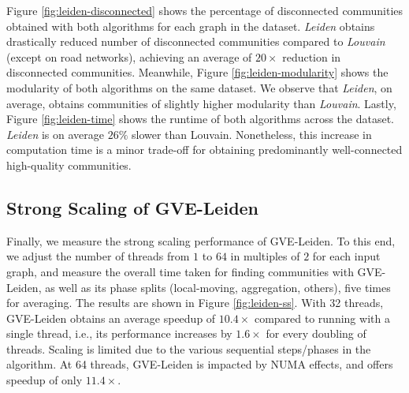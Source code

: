 Figure \ref{fig:leiden-disconnected} shows the percentage of disconnected communities obtained with both algorithms for each graph in the dataset. \textit{Leiden} obtains drastically reduced number of disconnected communities compared to \textit{Louvain} (except on road networks), achieving an average of $20\times$ reduction in disconnected communities. Meanwhile, Figure \ref{fig:leiden-modularity} shows the modularity of both algorithms on the same dataset. We observe that \textit{Leiden}, on average, obtains communities of slightly higher modularity than \textit{Louvain}. Lastly, Figure \ref{fig:leiden-time} shows the runtime of both algorithms across the dataset. \textit{Leiden} is on average $26\%$ slower than Louvain. Nonetheless, this increase in computation time is a minor trade-off for obtaining predominantly well-connected high-quality communities.




\subsection{Strong Scaling of GVE-Leiden}

Finally, we measure the strong scaling performance of GVE-Leiden. To this end, we adjust the number of threads from $1$ to $64$ in multiples of $2$ for each input graph, and measure the overall time taken for finding communities with GVE-Leiden, as well as its phase splits (local-moving, aggregation, others), five times for averaging. The results are shown in Figure \ref{fig:leiden-ss}. With 32 threads, GVE-Leiden obtains an average speedup of $10.4\times$ compared to running with a single thread, i.e., its performance increases by $1.6\times$ for every doubling of threads. Scaling is limited due to the various sequential steps/phases in the algorithm. At 64 threads, GVE-Leiden is impacted by NUMA effects, and offers speedup of only $11.4\times$.
